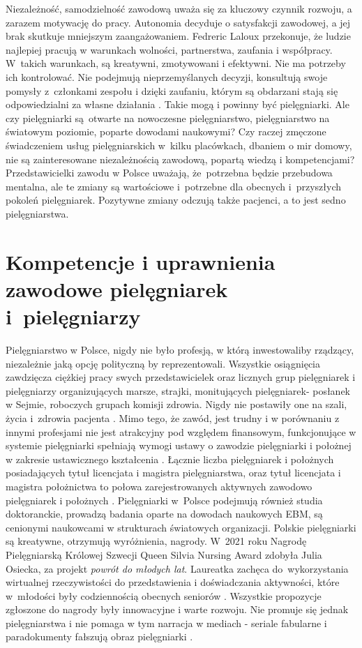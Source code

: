 \documentclass[a4paper,12pt,twoside,openright]{mwrep}
\begin{document}
Niezależność, samodzielność zawodową uważa się za kluczowy czynnik rozwoju, a zarazem motywację do pracy. Autonomia decyduje o satysfakcji zawodowej, a jej brak skutkuje mniejszym zaangażowaniem. Fedreric Laloux przekonuje, że ludzie najlepiej pracują w warunkach wolności, partnerstwa, zaufania i współpracy. W~takich warunkach, są kreatywni, zmotywowani i efektywni. Nie ma potrzeby ich kontrolować. Nie podejmują nieprzemyślanych decyzji, konsultują swoje pomysły z~członkami zespołu i dzięki zaufaniu, którym są obdarzani stają się odpowiedzialni za własne działania \cite{federic}. Takie mogą i powinny być pielęgniarki. Ale czy pielęgniarki są~otwarte na nowoczesne pielęgniarstwo, pielęgniarstwo na światowym poziomie, poparte dowodami naukowymi? Czy raczej zmęczone świadczeniem usług pielęgniarskich w~kilku placówkach, dbaniem o mir domowy, nie są zainteresowane niezależnością zawodową, popartą wiedzą i kompetencjami? Przedstawicielki zawodu w Polsce uważają, że~potrzebna będzie przebudowa mentalna, ale te zmiany są wartościowe i~potrzebne dla obecnych i~przyszłych pokoleń pielęgniarek. Pozytywne zmiany odczują także pacjenci, a to jest sedno pielęgniarstwa.

\section{Kompetencje i uprawnienia zawodowe  pielęgniarek i~pielęgniarzy}
Pielęgniarstwo w Polsce, nigdy nie było profesją, w którą inwestowaliby rządzący, niezależnie jaką opcję polityczną by reprezentowali. Wszystkie osiągnięcia zawdzięcza ciężkiej pracy swych przedstawicielek oraz licznych grup pielęgniarek i pielęgniarzy organizujących marsze, strajki, monitujących pielęgniarek- posłanek w Sejmie, roboczych grupach komisji zdrowia. Nigdy nie postawiły one na szali, życia i~zdrowia pacjenta \cite{strajk}. Mimo tego, że zawód, jest trudny i w porównaniu z innymi profesjami nie jest atrakcyjny pod względem finansowym, funkcjonujące w systemie pielęgniarki spełniają wymogi ustawy o zawodzie pielęgniarki i położnej  w zakresie ustawicznego kształcenia \cite{2011}. Łącznie liczba pielęgniarek i położnych posiadających tytuł licencjata i magistra pielęgniarstwa, oraz tytuł licencjata i magistra położnictwa to połowa zarejestrowanych aktywnych zawodowo pielęgniarek i położnych \cite{ile}. Pielęgniarki w~Polsce podejmują również studia doktoranckie, prowadzą badania oparte na dowodach naukowych EBM, są cenionymi naukowcami w strukturach światowych organizacji. Polskie pielęgniarki są kreatywne, otrzymują wyróżnienia, nagrody. W~2021 roku Nagrodę Pielęgniarską Królowej Szwecji Queen Silvia Nursing Award zdobyła Julia Osiecka, za projekt \textit{powrót do młodych lat}. Laureatka zachęca do~wykorzystania wirtualnej rzeczywistości do przedstawienia i doświadczania aktywności, które w~młodości były codziennością obecnych seniorów \cite{julia}. Wszystkie propozycje zgłoszone do nagrody były innowacyjne i warte rozwoju. Nie promuje się jednak  pielęgniarstwa i nie pomaga w tym narracja w mediach - seriale fabularne i paradokumenty fałszują obraz pielęgniarki \cite{postrzeganie}.
\end{document}
